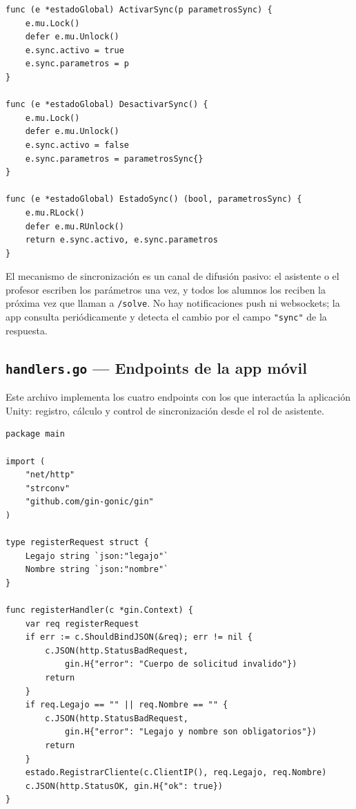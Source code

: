 \documentclass[12pt, a4paper]{article}
\begin{document}
\begin{lstlisting}[style=golang, caption={Control de sincronizacion}]
func (e *estadoGlobal) ActivarSync(p parametrosSync) {
    e.mu.Lock()
    defer e.mu.Unlock()
    e.sync.activo = true
    e.sync.parametros = p
}

func (e *estadoGlobal) DesactivarSync() {
    e.mu.Lock()
    defer e.mu.Unlock()
    e.sync.activo = false
    e.sync.parametros = parametrosSync{}
}

func (e *estadoGlobal) EstadoSync() (bool, parametrosSync) {
    e.mu.RLock()
    defer e.mu.RUnlock()
    return e.sync.activo, e.sync.parametros
}
\end{lstlisting}

El mecanismo de sincronización es un canal de difusión pasivo: el asistente o el
profesor escriben los parámetros una vez, y todos los alumnos los reciben la próxima
vez que llaman a \texttt{/solve}. No hay notificaciones push ni websockets; la app
consulta periódicamente y detecta el cambio por el campo \texttt{"sync"} de la
respuesta.

\subsection{\texttt{handlers.go} — Endpoints de la app móvil}

Este archivo implementa los cuatro endpoints con los que interactúa la aplicación
Unity: registro, cálculo y control de sincronización desde el rol de asistente.

\begin{lstlisting}[style=golang, caption={\texttt{handlers.go} — registro de alumno}]
package main

import (
    "net/http"
    "strconv"
    "github.com/gin-gonic/gin"
)

type registerRequest struct {
    Legajo string `json:"legajo"`
    Nombre string `json:"nombre"`
}

func registerHandler(c *gin.Context) {
    var req registerRequest
    if err := c.ShouldBindJSON(&req); err != nil {
        c.JSON(http.StatusBadRequest,
            gin.H{"error": "Cuerpo de solicitud invalido"})
        return
    }
    if req.Legajo == "" || req.Nombre == "" {
        c.JSON(http.StatusBadRequest,
            gin.H{"error": "Legajo y nombre son obligatorios"})
        return
    }
    estado.RegistrarCliente(c.ClientIP(), req.Legajo, req.Nombre)
    c.JSON(http.StatusOK, gin.H{"ok": true})
}
\end{lstlisting}
\end{document}
